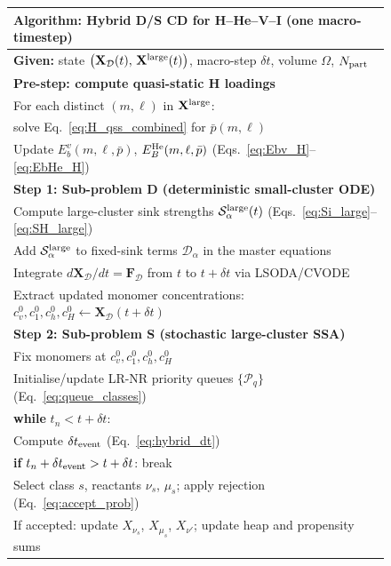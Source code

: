 \begin{figure}[htbp]
\centering
\renewcommand{\arraystretch}{1.15}
\begin{tabular}{l}
\hline\hline
\textbf{Algorithm: Hybrid D/S CD for H--He--V--I (one macro-timestep)} \\
\hline
\textbf{Given:} state $\bigl(\mathbf{X}_{\mathcal{D}}(t),\,
  \mathbf{X}^{\rm large}(t)\bigr)$, macro-step $\delta t$,
  volume $\Omega$, $N_{\rm part}$ \\[3pt]
%
\textbf{Pre-step: compute quasi-static H loadings} \\
\quad For each distinct $(m,\ell)$ in $\mathbf{X}^{\rm large}$: \\
\qquad solve Eq.~\eqref{eq:H_qss_combined} for $\bar{p}(m,\ell)$ \\
\quad Update $E_b^v(m,\ell,\bar{p})$, $E_B^{\rm He}(m,\ell,\bar{p})$
  (Eqs.~\ref{eq:Ebv_H}--\ref{eq:EbHe_H}) \\[3pt]
%
\textbf{Step 1: Sub-problem D (deterministic small-cluster ODE)} \\
\quad Compute large-cluster sink strengths
  $\mathcal{S}_\alpha^{\rm large}(t)$
  (Eqs.~\ref{eq:Si_large}--\ref{eq:SH_large}) \\
\quad Add $\mathcal{S}_\alpha^{\rm large}$ to fixed-sink terms
  $\mathcal{D}_\alpha$ in the master equations \\
\quad Integrate
  $d\mathbf{X}_{\mathcal{D}}/dt = \mathbf{F}_{\mathcal{D}}$
  from $t$ to $t+\delta t$ via LSODA/CVODE \\
\quad Extract updated monomer concentrations:
  $c_v^0, c_1^0, c_h^0, c_H^0 \leftarrow
  \mathbf{X}_{\mathcal{D}}(t+\delta t)$ \\[3pt]
%
\textbf{Step 2: Sub-problem S (stochastic large-cluster SSA)} \\
\quad Fix monomers at $c_v^0, c_1^0, c_h^0, c_H^0$ \\
\quad Initialise/update LR-NR priority queues
  $\{\mathcal{P}_q\}$ (Eq.~\ref{eq:queue_classes}) \\
\quad \textbf{while} $t_n < t + \delta t$: \\
\qquad Compute $\delta t_{\rm event}$
  (Eq.~\ref{eq:hybrid_dt}) \\
\qquad \textbf{if} $t_n + \delta t_{\rm event} > t + \delta t$:
  break \\
\qquad Select class $s$, reactants $\nu_s$, $\mu_s$;
  apply rejection (Eq.~\ref{eq:accept_prob}) \\
\qquad If accepted: update $X_{\nu_s}$, $X_{\mu_s}$, $X_{\nu'}$;
  update heap and propensity sums \\

\end{tabular}
\end{figure}
